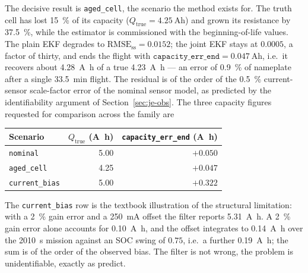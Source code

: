 The decisive result is \texttt{aged\_cell}, the scenario the method exists for.  The truth cell has
lost \SI{15}{\percent} of its capacity ($Q_\text{true}=\SI{4.25}{\ampere\hour}$) and grown its
resistance by \SI{37.5}{\percent}, while the estimator is commissioned with the beginning-of-life
values.  The plain EKF degrades to $\text{RMSE}_\text{ss}=0.0152$; the joint EKF stays at
$0.0005$, a factor of thirty, and ends the flight with
$\texttt{capacity\_err\_end}=\SI{+0.047}{\ampere\hour}$, i.e.\ it recovers about
\SI{4.28}{\ampere\hour} of a true \SI{4.23}{\ampere\hour} --- an error of \SI{0.9}{\percent} of
nameplate after a single \SI{33.5}{\minute} flight.  The residual is of the order of the
\SI{+0.5}{\percent} current-sensor scale-factor error of the nominal sensor model, as predicted by
the identifiability argument of Section~\ref{sec:je-obs}.  The three
capacity figures requested for comparison across the family are
\begin{center}
\begin{tabular}{@{}lrr@{}}
\toprule
Scenario & $Q_\text{true}$ (\si{\ampere\hour}) & \texttt{capacity\_err\_end} (\si{\ampere\hour})\\
\midrule
\texttt{nominal}      & 5.00 & $+0.050$\\
\texttt{aged\_cell}   & 4.25 & $+0.047$\\
\texttt{current\_bias}& 5.00 & $+0.322$\\
\bottomrule
\end{tabular}
\end{center}
The \texttt{current\_bias} row is the textbook illustration of the structural limitation: with a
\SI{+2}{\percent} gain error and a \SI{250}{\milli\ampere} offset the filter reports
\SI{5.31}{\ampere\hour}.  A \SI{2}{\percent} gain error alone accounts for
\SI{0.10}{\ampere\hour}, and the offset integrates to \SI{0.14}{\ampere\hour} over the
\SI{2010}{\second} mission against an SOC swing of $0.75$, i.e.\ a further
\SI{0.19}{\ampere\hour}; the sum is of the order of the observed bias.  The filter is not wrong, the problem is
unidentifiable, exactly as \cite{zhao2017observability,lin2018sensorbias} predict.


